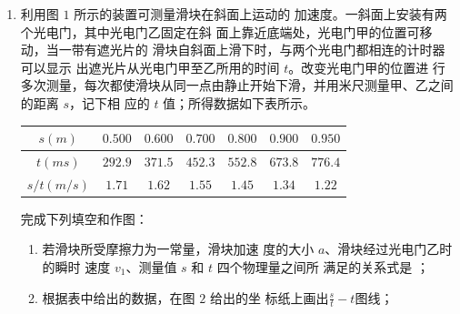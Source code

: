 \begin{enumerate}
\newpage
\item 
{}
利用图 $ 1 $ 所示的装置可测量滑块在斜面上运动的
加速度。一斜面上安装有两个光电门，其中光电门乙固定在斜
面上靠近底端处，光电门甲的位置可移动，当一带有遮光片的
滑块自斜面上滑下时，与两个光电门都相连的计时器可以显示
出遮光片从光电门甲至乙所用的时间 $ t $。改变光电门甲的位置进
行多次测量，每次都使滑块从同一点由静止开始下滑，并用米尺测量甲、乙之间的距离 $ s $，记下相
应的 $ t $ 值；所得数据如下表所示。
\begin{figure}[h!]
\centering

\end{figure}

\begin{table}[h!]
\centering 
\begin{tabular}{|c|c|c|c|c|c|c|}
\hline 
$ s(m) $ & $ 0.500 $ & $ 0.600 $ & $ 0.700 $ & $ 0.800 $ & $ 0.900 $ & $ 0.950 $
 \\
\hline
$ t(ms) $ & $ 292.9 $ & $ 371.5 $ & $ 452.3 $ & $ 552.8 $ & $ 673.8 $ & $ 776.4 $
 \\
\hline
$ s/t(m/s) $ & $ 1.71 $ & $ 1.62 $ & $ 1.55 $ & $ 1.45 $ & $ 1.34 $ & $ 1.22 $\\ 
\hline 
\end{tabular}
\end{table} 



完成下列填空和作图：

\begin{enumerate}
\renewcommand{\labelenumi}{\arabic{enumi}.}
\item
若滑块所受摩擦力为一常量，滑块加速
度的大小 $ a $、滑块经过光电门乙时的瞬时
速度 $ v_{1} $、测量值 $ s $ 和 $ t $ 四个物理量之间所
满足的关系式是  ；



\item 
根据表中给出的数据，在图 $ 2 $ 给出的坐
标纸上画出$\frac{s}{t}-t$图线；
\begin{figure}[h!]
\centering

\end{figure}

\banswer{
  
}



\end{enumerate}
\end{enumerate}
